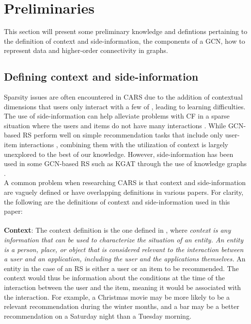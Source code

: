 \section{Preliminaries}\label{sec:preliminaries}
This section will present some preliminary knowledge and defintions pertaining to the definition of context and side-information, the components of a GCN, how to represent data and higher-order connectivity in graphs.

\subsection{Defining context and side-information}\label{subsec:define_context_sideinfo}
Sparsity issues are often encountered in CARS due to the addition of contextual dimensions that users only interact with a few of \cite{SparsityCARS}, leading to learning difficulties.
The use of side-information can help alleviate problems with CF in a sparse situation where the users and items do not have many interactions \cite{KGAT}.
While GCN-based RS perform well on simple recommendation tasks that include only user-item interactions \cite{NGCF,LightGCN}, combining them with the utilization of context is largely unexplored to the best of our knowledge.
However, side-information has been used in some GCN-based RS such as KGAT through the use of knowledge graphs \cite{KGAT}.\\
A common problem when researching CARS is that context and side-information are vaguely defined or have overlapping definitions in various papers.
For clarity, the following are the definitions of context and side-information used in this paper:
\\\\
\textbf{Context}:
The context definition is the one defined in \cite{contextDefinition}, where \textit{context is any information that can be used to characterize the situation of an entity. An entity is a person, place, or object that is considered relevant to the interaction between a user and an application, including the user and the applications themselves.}
An entity in the case of an RS is either a user or an item to be recommended.
The context would thus be information about the conditions at the time of the interaction between the user and the item, meaning it would be associated with the interaction.
For example, a Christmas movie may be more likely to be a relevant recommendation during the winter months, and a bar may be a better recommendation on a Saturday night than a Tuesday morning.\\
